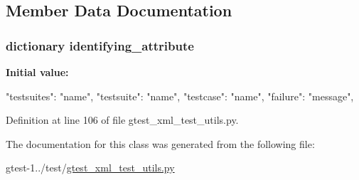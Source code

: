 \subsection{\-Member \-Data \-Documentation}
\hypertarget{classgtest__xml__test__utils_1_1GTestXMLTestCase_adecb9d1291e48bb151b7e46f14ea7df7}{
\subsubsection[{identifying\-\_\-attribute}]{\setlength{\rightskip}{0pt plus 5cm}dictionary {\bf identifying\-\_\-attribute}}}\label{d0/d31/classgtest__xml__test__utils_1_1GTestXMLTestCase_adecb9d1291e48bb151b7e46f14ea7df7}
{\bfseries \-Initial value\-:}
\begin{DoxyCode}
{
    "testsuites": "name",
    "testsuite": "name",
    "testcase":  "name",
    "failure":   "message",
    }
\end{DoxyCode}


\-Definition at line 106 of file gtest\-\_\-xml\-\_\-test\-\_\-utils.\-py.



\-The documentation for this class was generated from the following file\-:\begin{DoxyCompactItemize}
\item 
gtest-\/1../test/\hyperlink{gtest__xml__test__utils_8py}{gtest\-\_\-xml\-\_\-test\-\_\-utils.\-py}\end{DoxyCompactItemize}
